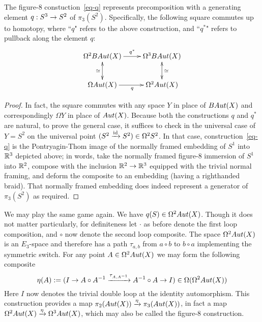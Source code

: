 \documentclass{amsart}
\begin{document}
\begin{lemma} \label{lemma-q}
The figure-8 constuction~\eqref{eq-q} represents precomposition with a generating element $q: S^3 \rightarrow S^2$ of $\pi_3(S^2)$.  Specifically, the following square commutes up to homotopy, where ``$q$" refers to the above construction, and ``$q^\ast$" refers to pullback along the element $q$:
\begin{equation} \nn
\xymatrix{
\Omega^2 B\Aut(X) \ar[r]^{q^\ast} \ar@{<->}[d]_{\simeq} & \Omega^3 B\Aut(X)  \ar@{<->}[d]^{\simeq} \\
\Omega \Aut(X) \ar[r]_{q} & \Omega^2 \Aut(X)
}
\end{equation}
\end{lemma}

\begin{proof}
In fact, the square commutes with any space $Y$ in place of $BAut(X)$ and correspondingly $\Omega Y$ in place of $Aut(X)$.  Because both the constructions $q$ and $q^\ast$ are natural, to prove the general case, it suffices to check in the universal case of $Y = S^2$ on the universal point $(S^2 \xrightarrow{\mathrm{id}} S^2) \in \Omega^2 S^2$.  In that case, construction~\eqref{eq-q} is the Pontryagin-Thom image of the normally framed embedding of $S^1$ into $\mathbb R^3$ depicted above; in words, take the normally framed figure-8 immersion of $S^1$ into $\mathbb R^2$, compose with the inclusion $\mathbb R^2 \rightarrow \mathbb R^3$ equipped with the trivial normal framing, and deform the composite to an embedding (having a righthanded braid).  That normally framed embedding does indeed represent a generator of $\pi_3(S^2)$ as required.
\end{proof}

We may play the same game again.  We have $q(S) \in \Omega^2 Aut(X)$.  Though it does not matter particularly, for definiteness let $\cdot$ as before denote the first loop composition, and $\circ$ now denote the second loop composite.  The space $\Omega^2 Aut(X)$ is an $E_3$-space and therefore has a path $\tau_{a,b}$ from $a \circ b$ to $b \circ a$ implementing the symmetric switch.  For any point $A \in \Omega^2 Aut(X)$ we may form the following composite
\begin{equation} \label{eq-eta}
\eta(A) := (I \rightarrow A \circ A^{-1} \xrightarrow{\tau_{A,A^{-1}}} A^{-1} \circ A \rightarrow I) \in \Omega(\Omega^2 Aut(X))
\end{equation}
Here $I$ now denotes the trivial double loop at the identity automorphism.  This construction provides a map $\pi_2(Aut(X)) \xrightarrow{\eta} \pi_3(Aut(X))$, in fact a map $\Omega^2 Aut(X) \xrightarrow{\eta} \Omega^3 Aut(X)$, which may also be called the figure-8 construction.
\end{document}

